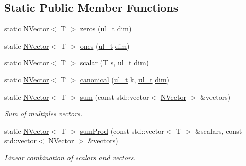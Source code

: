 \subsection*{Static Public Member Functions}
\begin{DoxyCompactItemize}
\item 
static \mbox{\hyperlink{class_n_vector}{N\+Vector}}$<$ T $>$ \mbox{\hyperlink{class_n_vector_a6253cef3c39dd9d388bbf7d17069bc51}{zeros}} (\mbox{\hyperlink{group___n_algebra_ga1b140a2034db3f5dfe18a987745df43a}{ul\+\_\+t}} \mbox{\hyperlink{class_n_vector_a7589027db20509ac4d93490bb9a1979a}{dim}})
\item 
static \mbox{\hyperlink{class_n_vector}{N\+Vector}}$<$ T $>$ \mbox{\hyperlink{class_n_vector_afb6358454a8dfaac4963352843b17bbc}{ones}} (\mbox{\hyperlink{group___n_algebra_ga1b140a2034db3f5dfe18a987745df43a}{ul\+\_\+t}} \mbox{\hyperlink{class_n_vector_a7589027db20509ac4d93490bb9a1979a}{dim}})
\item 
static \mbox{\hyperlink{class_n_vector}{N\+Vector}}$<$ T $>$ \mbox{\hyperlink{class_n_vector_add6abbdea5f58e6887367860aa0f619d}{scalar}} (T s, \mbox{\hyperlink{group___n_algebra_ga1b140a2034db3f5dfe18a987745df43a}{ul\+\_\+t}} \mbox{\hyperlink{class_n_vector_a7589027db20509ac4d93490bb9a1979a}{dim}})
\item 
static \mbox{\hyperlink{class_n_vector}{N\+Vector}}$<$ T $>$ \mbox{\hyperlink{class_n_vector_a37b19eb888023546363e952cd39ea3a1}{canonical}} (\mbox{\hyperlink{group___n_algebra_ga1b140a2034db3f5dfe18a987745df43a}{ul\+\_\+t}} k, \mbox{\hyperlink{group___n_algebra_ga1b140a2034db3f5dfe18a987745df43a}{ul\+\_\+t}} \mbox{\hyperlink{class_n_vector_a7589027db20509ac4d93490bb9a1979a}{dim}})
\item 
static \mbox{\hyperlink{class_n_vector}{N\+Vector}}$<$ T $>$ \mbox{\hyperlink{class_n_vector_af0f5749405554fc23a0af67ad4f9e9e5}{sum}} (const std\+::vector$<$ \mbox{\hyperlink{class_n_vector}{N\+Vector}} $>$ \&vectors)
\begin{DoxyCompactList}\small\item\em Sum of multiples vectors. \end{DoxyCompactList}\item 
static \mbox{\hyperlink{class_n_vector}{N\+Vector}}$<$ T $>$ \mbox{\hyperlink{class_n_vector_a89ea4dcaa84313e6446e0be35ec7bbe1}{sum\+Prod}} (const std\+::vector$<$ T $>$ \&scalars, const std\+::vector$<$ \mbox{\hyperlink{class_n_vector}{N\+Vector}} $>$ \&vectors)
\begin{DoxyCompactList}\small\item\em Linear combination of {\ttfamily scalars} and {\ttfamily vectors}. \end{DoxyCompactList}\end{DoxyCompactItemize}
